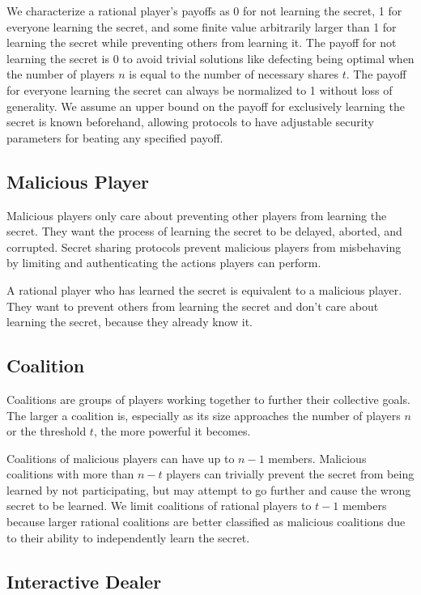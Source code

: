 \documentclass[12pt]{dalcsthesis}
\begin{document}
We characterize a rational player's payoffs as 0 for not learning the secret, 1 for everyone learning the secret, and some finite value arbitrarily larger than 1 for learning the secret while preventing others from learning it. The payoff for not learning the secret is 0 to avoid trivial solutions like defecting being optimal when the number of players $n$ is equal to the number of necessary shares $t$. The payoff for everyone learning the secret can always be normalized to 1 without loss of generality. We assume an upper bound on the payoff for exclusively learning the secret is known beforehand, allowing protocols to have adjustable security parameters for beating any specified payoff.

\subsection{Malicious Player}

Malicious players only care about preventing other players from learning the secret. They want the process of learning the secret to be delayed, aborted, and corrupted. Secret sharing protocols prevent malicious players from misbehaving by limiting and authenticating the actions players can perform.

A rational player who has learned the secret is equivalent to a malicious player. They want to prevent others from learning the secret and don't care about learning the secret, because they already know it.

\subsection{Coalition}

Coalitions are groups of players working together to further their collective goals. The larger a coalition is, especially as its size approaches the number of players $n$ or the threshold $t$, the more powerful it becomes.

Coalitions of malicious players can have up to $n-1$ members. Malicious coalitions with more than $n-t$ players can trivially prevent the secret from being learned by not participating, but may attempt to go further and cause the wrong secret to be learned. We limit coalitions of rational players to $t-1$ members because larger rational coalitions are better classified as malicious coalitions due to their ability to independently learn the secret.

\subsection{Interactive Dealer}
\end{document}
